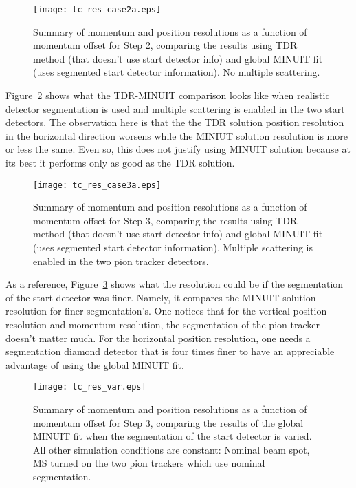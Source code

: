 \documentclass[20]{article}
\begin{document}
\begin{figure}[tbp]
  \texttt{[image: tc\_res\_case2a.eps]}
  \caption{Summary of momentum and position resolutions as a function
    of momentum offset for Step 2, comparing the results using TDR
    method (that doesn't use start detector info) and global MINUIT
    fit (uses segmented start detector information). No multiple scattering. } 
  \label {step2a:res}
\end{figure}


Figure~\ref{step3a:res} shows what the TDR-MINUIT comparison looks
like when realistic detector segmentation is used and multiple
scattering is enabled in the two start detectors. The observation here
is that the the TDR solution position resolution in the horizontal
direction worsens while the MINIUT solution resolution is more or less
the same. Even so, this does not justify using MINUIT solution because
at its best it performs only as good as the TDR solution.

\begin{figure}[tbp]
  \texttt{[image: tc\_res\_case3a.eps]}
  \caption{Summary of momentum and position resolutions as a function
    of momentum offset for Step 3, comparing the results using TDR
    method (that doesn't use start detector info) and global MINUIT
    fit (uses segmented start detector information). Multiple
    scattering is enabled in the two pion tracker detectors. }
  \label {step3a:res}
\end{figure}

As a reference, Figure~\ref{step3:variations} shows what the
resolution could be if the segmentation of the start detector was
finer. Namely, it compares the MINUIT solution resolution for finer
segmentation's. One notices that for the vertical position resolution
and momentum resolution, the segmentation of the pion tracker doesn't
matter much. For the horizontal position resolution, one needs a
segmentation diamond detector that is four times finer to have an
appreciable advantage of using the global MINUIT fit.

\begin{figure}[tbp]
  \texttt{[image: tc\_res\_var.eps]}
  \caption{Summary of momentum and position resolutions as a function
    of momentum offset for Step 3, comparing the results of the global
    MINUIT fit when the segmentation of the start detector is
    varied. All other simulation conditions are constant: Nominal
    beam spot, MS turned on the two pion trackers which use nominal
    segmentation.}
  \label {step3:variations}
\end{figure}
\end{document}
